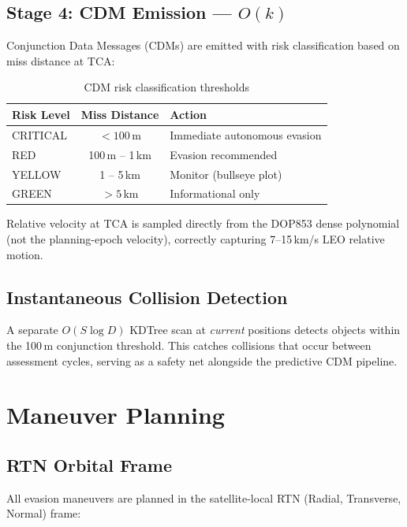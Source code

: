 \documentclass[11pt,a4paper]{article}
\begin{document}
\subsection{Stage 4: CDM Emission --- $O(k)$}

Conjunction Data Messages (CDMs) are emitted with risk classification based on
miss distance at TCA:

\begin{table}[H]
\centering
\caption{CDM risk classification thresholds}
\begin{tabular}{@{}lcl@{}}
\toprule
\textbf{Risk Level} & \textbf{Miss Distance} & \textbf{Action} \\
\midrule
CRITICAL & $< 100$\,m   & Immediate autonomous evasion \\
RED      & 100\,m -- 1\,km  & Evasion recommended \\
YELLOW   & 1 -- 5\,km   & Monitor (bullseye plot) \\
GREEN    & $> 5$\,km    & Informational only \\
\bottomrule
\end{tabular}
\end{table}

Relative velocity at TCA is sampled directly from the DOP853 dense polynomial
(not the planning-epoch velocity), correctly capturing 7--15\,km/s LEO
relative motion.

\subsection{Instantaneous Collision Detection}

A separate $O(S \log D)$ KDTree scan at \emph{current} positions detects
objects within the 100\,m conjunction threshold. This catches collisions that
occur between assessment cycles, serving as a safety net alongside the
predictive CDM pipeline.

\section{Maneuver Planning}

\subsection{RTN Orbital Frame}

All evasion maneuvers are planned in the satellite-local RTN (Radial,
Transverse, Normal) frame:
\end{document}

